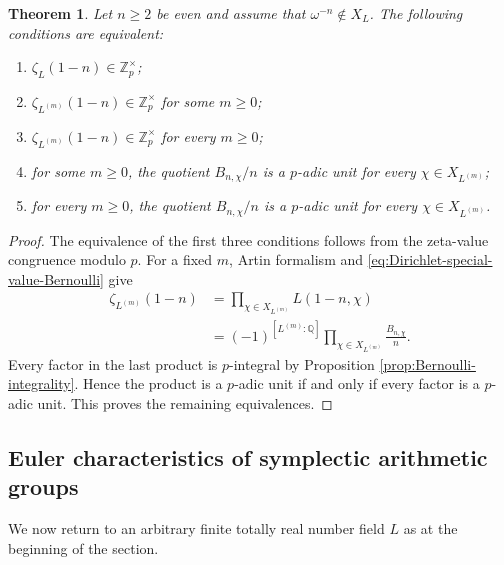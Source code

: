 \documentclass[11pt,table]{amsart}
\newtheorem{theorem}{Theorem}[section]
\numberwithin{equation}{section}
\begin{document}
\begin{theorem}
\label{thm:Bernoulli-unit-criterion}
Let \(n\geq 2\) be even and assume that
\(\omega^{-n}\notin X_L\). The following conditions are equivalent:
\begin{enumerate}
\item \(\zeta_L(1-n)\in\mathbb Z_p^\times\);
\item \(\zeta_{L^{(m)}}(1-n)\in\mathbb Z_p^\times\) for some
\(m\geq 0\);
\item \(\zeta_{L^{(m)}}(1-n)\in\mathbb Z_p^\times\) for every
\(m\geq 0\);
\item for some \(m\geq 0\), the quotient \(B_{n,\chi}/n\) is a
\(p\)-adic unit for every \(\chi\in X_{L^{(m)}}\);
\item for every \(m\geq 0\), the quotient \(B_{n,\chi}/n\) is a
\(p\)-adic unit for every \(\chi\in X_{L^{(m)}}\).
\end{enumerate}
\end{theorem}

\begin{proof}
The equivalence of the first three conditions follows from the
zeta-value congruence modulo \(p\). For a fixed \(m\), Artin
formalism and \eqref{eq:Dirichlet-special-value-Bernoulli} give
\begin{equation}
\begin{split}
        \zeta_{L^{(m)}}(1-n)
        &=
        \prod_{\chi\in X_{L^{(m)}}}L(1-n,\chi)\\
        &=
        (-1)^{[L^{(m)}:\mathbb Q]}
        \prod_{\chi\in X_{L^{(m)}}}\frac{B_{n,\chi}}{n}.
\end{split}
        \label{eq:zeta-product-Bernoulli}
\end{equation}
Every factor in the last product is \(p\)-integral by Proposition
\ref{prop:Bernoulli-integrality}. Hence the product is a \(p\)-adic
unit if and only if every factor is a \(p\)-adic unit. This proves the
remaining equivalences.
\end{proof}


\subsection{Euler characteristics of symplectic arithmetic groups}
\label{subsec:symplectic-Euler-characteristics}

\par We now return to an arbitrary finite totally real number field \(L\)
as at the beginning of the section.
\end{document}
